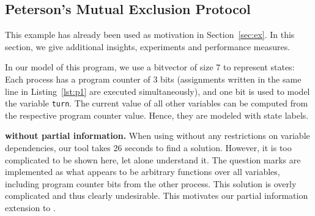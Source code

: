 
\subsection{Peterson's Mutual Exclusion Protocol}
\label{sec:exp_pet}


\noindent
This example has already been used as motivation in Section~\ref{sec:ex}.
In this section, we give additional insights, experiments and performance
measures.

In our model of this program, we use a bitvector of size 7 to represent states:
Each process has a program counter of 3 bits (assignments written in the same
line in Listing~\ref{lst:p1} are executed simultaneously), and one bit is used
to model the variable \texttt{turn}.  The current value of all other variables
can be computed from the respective program counter value. Hence, they are
modeled with state labels.

\textbf{\ags without partial information.}
When using \ags without any restrictions on variable dependencies, our tool 
takes 26 seconds to find a solution. However, it is too complicated to be shown 
here, let alone understand it.  The question marks are implemented as what 
appears to be arbitrary functions over all variables, including program counter 
bits from the other process. This solution is overly complicated and thus 
clearly undesirable. This motivates our partial information extension to \ags.



